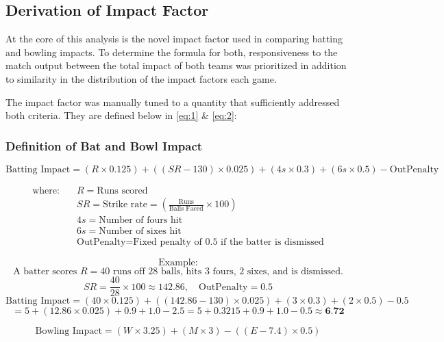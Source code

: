 \documentclass{article}[12pt]
\newcommand{\Autoref}[1]{\autoref{#1}}
\begin{document}
\subsection{Derivation of Impact Factor}

At the core of this analysis is the novel impact factor used in comparing batting and bowling impacts. To determine the formula for both, responsiveness to the match output between the total impact of both teams was prioritized in addition to similarity in the distribution of the impact factors each game.

The impact factor was manually tuned to a quantity that sufficiently addressed both criteria. They are defined below in \Autoref{eq:1} \& \Autoref{eq:2}:

\subsubsection{Definition of Bat and Bowl Impact}
\begin{equation}
    \text{Batting Impact} = (R \times 0.125) + ((SR - 130) \times 0.025) + (4s \times 0.3) + (6s \times 0.5) - \text{OutPenalty}
    \label{eq:1}
\end{equation}



\[
\begin{aligned}
\text{where:} \quad 
& R = \text{Runs scored} \\
& SR = \text{Strike rate} = \left( \frac{\text{Runs}}{\text{Balls Faced}} \times 100 \right) \\
& 4s = \text{Number of fours hit} \\
& 6s = \text{Number of sixes hit} \\
& \text{OutPenalty} = \text{Fixed penalty of 0.5 if the batter is dismissed}
\end{aligned}
\]

\[
\text{Example:}
\]
\[
\text{A batter scores } R = 40 \text{ runs off } 28 \text{ balls, hits } 3 \text{ fours, 2 sixes, and is dismissed.}
\]
\[
SR = \frac{40}{28} \times 100 \approx 142.86, \quad \text{OutPenalty} = 0.5
\]
\[
\text{Batting Impact} = (40 \times 0.125) + ((142.86 - 130) \times 0.025) + (3 \times 0.3) + (2 \times 0.5) - 0.5
\]
\[
= 5 + (12.86 \times 0.025) + 0.9 + 1.0 - 2.5 = 5 + 0.3215 + 0.9 + 1.0 - 0.5 \approx \textbf{6.72}
\]

\begin{equation}
    \text{Bowling Impact} = (W \times 3.25) + (M \times 3) - ((E - 7.4) \times 0.5)
    \label{eq:2}
\end{equation}
\end{document}
